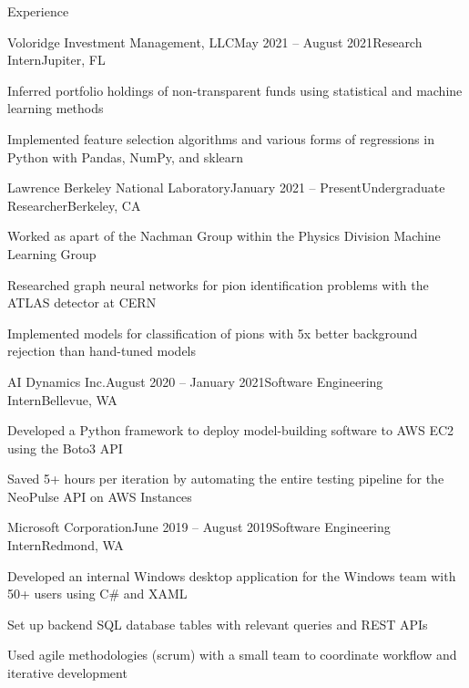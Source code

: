 \documentclass{resume} %
\begin{document}
\begin{rSection}{Experience}

\begin{rSubsection}{Voloridge Investment Management, LLC}{May 2021 – August 2021}{Research Intern}{Jupiter, FL}
\item Inferred portfolio holdings of non-transparent funds using statistical and machine learning methods
\item Implemented feature selection algorithms and various forms of regressions in Python with Pandas, NumPy, and sklearn
\end{rSubsection}

\begin{rSubsection}{Lawrence Berkeley National Laboratory}{January 2021 – Present}{Undergraduate Researcher}{Berkeley, CA}
\item Worked as apart of the Nachman Group within the Physics Division Machine Learning Group
\item Researched graph neural networks for pion identification problems with the ATLAS detector at CERN
\item Implemented models for classification of pions with 5x better background rejection than hand-tuned models
\end{rSubsection}

\begin{rSubsection}{AI Dynamics Inc.}{August 2020 – January 2021}{Software Engineering Intern}{Bellevue, WA}
\item Developed a Python framework to deploy model-building software to AWS EC2 using the Boto3 API
\item Saved 5+ hours per iteration by automating the entire testing pipeline for the NeoPulse API on AWS Instances
\end{rSubsection}

\begin{rSubsection}{Microsoft Corporation}{June 2019 – August 2019}{Software Engineering Intern}{Redmond, WA}
\item Developed an internal Windows desktop application for the Windows team with 50+ users using C\# and XAML
\item Set up backend SQL database tables with relevant queries and REST APIs
\item Used agile methodologies (scrum) with a small team to coordinate workflow and iterative development
\end{rSubsection}

\end{rSection}
\end{document}
